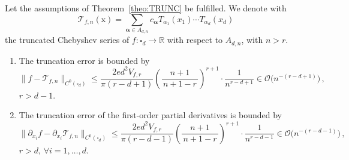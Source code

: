 \documentclass[10pt,a4paper]{amsart}
\newcommand{\Oc}{\mathcal{O}}
\newcommand{\R}{\mathbb{R}}
\newcommand{\p}{\partial}
\begin{document}
\begin{corollary}\label{coir:trunc} Let the assumptions of Theorem~\ref{theo:TRUNC} be fulfilled. We denote with
\begin{equation}
\mathcal{T}_{f,n}(\mathrm{x})=\sum_{\boldsymbol{\alpha} \in A_{d,n}}c_{\boldsymbol{\alpha}}T_{\alpha_1}(x_1)\cdots T_{\alpha_d}(x_d)
\end{equation}
the truncated Chebyshev series of $f : \square_d \to \R$ with respect to $A_{d,n}$, with $n >r$.
\begin{enumerate}[label=\roman*)]
    \item \label{item:approx_1} The truncation error is bounded by
    \begin{equation}\label{eq:trunc}
        \|f - \mathcal{T}_{f,n}\|_{C^0(\square_d)} \leq \frac{2ed^2V_{f,r}}{\pi(r-d+1)}\left(\frac{n+1}{\,n+1-r\,}\right)^{r+1}\cdot \frac{1}{n^{r-d+1}} \in\Oc\big(n^{-(r-d+1)}\big)\,,
    \end{equation}
    $r>d-1$.
    \item \label{item:approx_2} The truncation 
    error of the first-order partial derivatives is bounded by
        \begin{equation}\label{eq:dtrunc}
        \|\p_{x_i} f - \p_{x_i} \mathcal{T}_{f,n}\|_{C^0(\square_d)} \leq \frac{2ed^2V_{f,r}}{\pi(r-d-1)}\left(\frac{n+1}{\,n+1-r\,}\right)^{r+1}\cdot\frac{1}{n^{r-d-1}}\in\Oc\big(n^{-(r-d-1)}\big)\,, 
    \end{equation}
    $r>d$, $\forall i=1,\dots,d.$
\end{enumerate}
\end{corollary}
\end{document}
